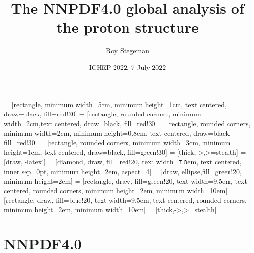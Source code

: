 \documentclass[aspectratio=169,9pt]{beamer}
\title{The NNPDF4.0 global analysis of the proton structure}
\date{ICHEP 2022, 7 July 2022}
\author{Roy Stegeman}
\institute{University of Milan and INFN Milan}
\begin{document}
{
\begin{frame}
  \titlepage
\end{frame}
}


\usetikzlibrary{shapes, arrows}
\usetikzlibrary{decorations.pathreplacing}
\usetikzlibrary{positioning, calc}
 = [rectangle, minimum width=5cm, minimum height=1cm, text centered, draw=black, fill=red!30]
 = [rectangle, rounded corners, minimum width=2cm,text centered, draw=black, fill=red!30]
 = [rectangle, rounded corners, minimum width=2cm, minimum height=0.8cm, text centered, draw=black, fill=red!30]
 = [rectangle, rounded corners, minimum width=3cm, minimum height=1cm, text centered, draw=black, fill=green!30]
 = [thick,->,>=stealth]
 =[draw, -latex']
 = [diamond, draw, fill=red!20, text width=7.5em, text centered,  inner sep=0pt, minimum height=2em, aspect=4]
 = [draw, ellipse,fill=green!20, minimum height=2em]
 = [rectangle, draw, fill=green!20, text width=9.5em, text centered, rounded corners, minimum height=2em, minimum width=10em]
=[rectangle, draw, fill=blue!20, text width=9.5em, 
                   text centered, rounded corners, minimum height=2em, 
                   minimum width=10em]
 = [thick,->,>=stealth]




\section*{NNPDF4.0}

\end{document}
